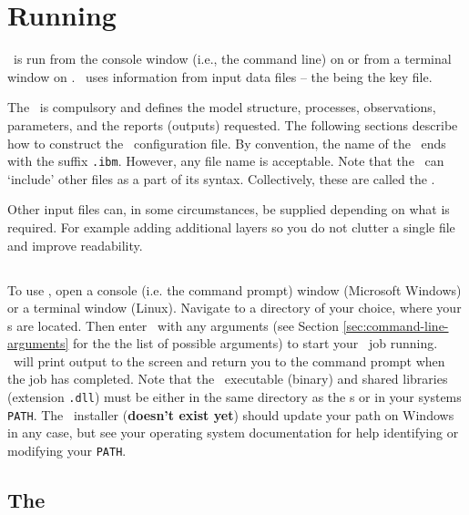 \section{Running \IBM\label{sec:running}}

\IBM\ is run from the console window (i.e., the command line) on  or from a terminal window on . \IBM\ uses information from input data files -- the \emph{\config{}} being the key file. 

The \config\ is compulsory and defines the model structure, processes, observations, parameters, and the reports (outputs) requested. The following sections  describe how to construct the \IBM\ configuration file. By convention, the name of the \config\ ends with the suffix \texttt{.ibm}. However, any file name is acceptable. Note that the \config\ can `include' other files as a part of its syntax. Collectively, these are called the \config.

Other input files can, in some circumstances, be supplied depending on what is required. For example adding additional layers so you do not clutter a single file and improve readability.

\subsection{}

To use \IBM, open a console (i.e. the command prompt) window (Microsoft Windows) or a terminal window (Linux). Navigate to a directory of your choice, where your \config s are located. Then enter \ibm\ with any arguments (see Section \ref{sec:command-line-arguments} for the the list of possible arguments) to start your \IBM\ job running. \IBM\ will print output to the screen and return you to the command prompt when the job has completed. Note that the \IBM\ executable (binary) and shared libraries (extension \texttt{.dll}) must be either in the same directory as the \config s or in your systems \texttt{PATH}. The \IBM\ installer (\textbf{doesn't exist yet}) should update your path on Windows in any case, but see your operating system documentation for help identifying or modifying your \texttt{PATH}.


\subsection{The \config\label{sec:config-files}}

